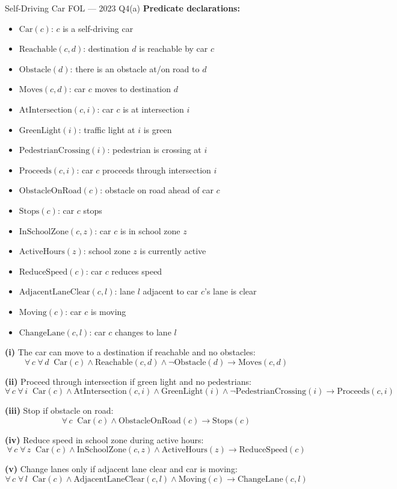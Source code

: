 \documentclass[12pt,a4paper]{article}
\newcommand{\ALL}[1]{\forall\,#1\;}
\newcommand{\ra}{\rightarrow}
\begin{document}
\begin{solbox}{Self-Driving Car FOL --- 2023 Q4(a)}
\textbf{Predicate declarations:}
\begin{itemize}[noitemsep]
  \item $\mathrm{Car}(c)$: $c$ is a self-driving car
  \item $\mathrm{Reachable}(c,d)$: destination $d$ is reachable by car $c$
  \item $\mathrm{Obstacle}(d)$: there is an obstacle at/on road to $d$
  \item $\mathrm{Moves}(c,d)$: car $c$ moves to destination $d$
  \item $\mathrm{AtIntersection}(c,i)$: car $c$ is at intersection $i$
  \item $\mathrm{GreenLight}(i)$: traffic light at $i$ is green
  \item $\mathrm{PedestrianCrossing}(i)$: pedestrian is crossing at $i$
  \item $\mathrm{Proceeds}(c,i)$: car $c$ proceeds through intersection $i$
  \item $\mathrm{ObstacleOnRoad}(c)$: obstacle on road ahead of car $c$
  \item $\mathrm{Stops}(c)$: car $c$ stops
  \item $\mathrm{InSchoolZone}(c,z)$: car $c$ is in school zone $z$
  \item $\mathrm{ActiveHours}(z)$: school zone $z$ is currently active
  \item $\mathrm{ReduceSpeed}(c)$: car $c$ reduces speed
  \item $\mathrm{AdjacentLaneClear}(c,l)$: lane $l$ adjacent to car $c$'s lane is clear
  \item $\mathrm{Moving}(c)$: car $c$ is moving
  \item $\mathrm{ChangeLane}(c,l)$: car $c$ changes to lane $l$
\end{itemize}

\medskip\textbf{(i)} The car can move to a destination if reachable and no obstacles:
\[\ALL{c}\ALL{d}\;\mathrm{Car}(c) \land \mathrm{Reachable}(c,d) \land \neg\mathrm{Obstacle}(d) \ra \mathrm{Moves}(c,d)\]

\textbf{(ii)} Proceed through intersection if green light and no pedestrians:
\[\ALL{c}\ALL{i}\;\mathrm{Car}(c) \land \mathrm{AtIntersection}(c,i) \land \mathrm{GreenLight}(i) \land \neg\mathrm{PedestrianCrossing}(i) \ra \mathrm{Proceeds}(c,i)\]

\textbf{(iii)} Stop if obstacle on road:
\[\ALL{c}\;\mathrm{Car}(c) \land \mathrm{ObstacleOnRoad}(c) \ra \mathrm{Stops}(c)\]

\textbf{(iv)} Reduce speed in school zone during active hours:
\[\ALL{c}\ALL{z}\;\mathrm{Car}(c) \land \mathrm{InSchoolZone}(c,z) \land \mathrm{ActiveHours}(z) \ra \mathrm{ReduceSpeed}(c)\]

\textbf{(v)} Change lanes only if adjacent lane clear and car is moving:
\[\ALL{c}\ALL{l}\;\mathrm{Car}(c) \land \mathrm{AdjacentLaneClear}(c,l) \land \mathrm{Moving}(c) \ra \mathrm{ChangeLane}(c,l)\]
\end{solbox}
\end{document}
